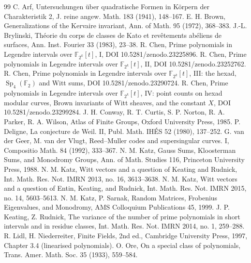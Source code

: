 \documentclass[12pt,a4paper]{amsart}
\theoremstyle{definition}
\newcommand{\F}{\mathbb{F}}
\newcommand{\Sp}{\operatorname{Sp}}
\begin{document}
\clearpage
\begin{thebibliography}{99}
 C. Arf, Untersuchungen \"uber quadratische Formen in K\"orpern der Charakteristik 2, J. reine angew. Math. 183 (1941), 148--167.
 E. H. Brown, Generalizations of the Kervaire invariant, Ann. of Math. 95 (1972), 368--383.
 J.-L. Brylinski, Th\'eorie du corps de classes de Kato et rev\^etements ab\'eliens de surfaces, Ann. Inst. Fourier 33 (1983), 23--38.
 R. Chen, Prime polynomials in Legendre intervals over $\F_{2^k}[t]$, I, DOI 10.5281/zenodo.23225896.
 R. Chen, Prime polynomials in Legendre intervals over $\F_{2^k}[t]$, II, DOI 10.5281/zenodo.23252762.
 R. Chen, Prime polynomials in Legendre intervals over $\F_{2^k}[t]$, III: the hexad, $\Sp_4(\F_2)$ and Witt sums, DOI 10.5281/zenodo.23290724.
 R. Chen, Prime polynomials in Legendre intervals over $\F_{2^k}[t]$, IV: point counts on hexad modular curves, Brown invariants of Witt sheaves, and the constant $X$, DOI 10.5281/zenodo.23299284.
 J. H. Conway, R. T. Curtis, S. P. Norton, R. A. Parker, R. A. Wilson, Atlas of Finite Groups, Oxford University Press, 1985.
 P. Deligne, La conjecture de Weil. II, Publ. Math. IH\'ES 52 (1980), 137--252.
 G. van der Geer, M. van der Vlugt, Reed--Muller codes and supersingular curves. I, Compositio Math. 84 (1992), 333--367.
 N. M. Katz, Gauss Sums, Kloosterman Sums, and Monodromy Groups, Ann. of Math. Studies 116, Princeton University Press, 1988.
 N. M. Katz, Witt vectors and a question of Keating and Rudnick, Int. Math. Res. Not. IMRN 2013, no. 16, 3613--3638.
 N. M. Katz, Witt vectors and a question of Entin, Keating, and Rudnick, Int. Math. Res. Not. IMRN 2015, no. 14, 5603--5613.
 N. M. Katz, P. Sarnak, Random Matrices, Frobenius Eigenvalues, and Monodromy, AMS Colloquium Publications 45, 1999.
 J. P. Keating, Z. Rudnick, The variance of the number of prime polynomials in short intervals and in residue classes, Int. Math. Res. Not. IMRN 2014, no. 1, 259--288.
 R. Lidl, H. Niederreiter, Finite Fields, 2nd ed., Cambridge University Press, 1997, Chapter 3.4 (linearised polynomials).
 O. Ore, On a special class of polynomials, Trans. Amer. Math. Soc. 35 (1933), 559--584.
\end{thebibliography}
\end{document}
